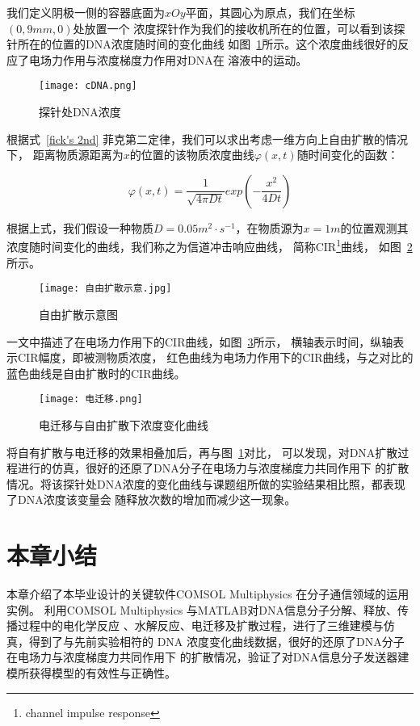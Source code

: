 我们定义阴极一侧的容器底面为$xOy$平面，其圆心为原点，我们在坐标$(0,9mm,0)$处放置一个
浓度探针作为我们的接收机所在的位置，可以看到该探针所在的位置的DNA浓度随时间的变化曲线
如图~\ref{fig:cDNAatP}所示。这个浓度曲线很好的反应了电场力作用与浓度梯度力作用对DNA在
溶液中的运动。
\begin{figure}[H]
    \centering
    \texttt{[image: cDNA.png]}
    \caption{探针处DNA浓度}
    \label{fig:cDNAatP}
\end{figure}

根据式~\ref{fick's 2nd} 菲克第二定律，我们可以求出考虑一维方向上自由扩散的情况下，
距离物质源距离为$x$的位置的该物质浓度曲线$\varphi(x,t)$随时间变化的函数：

\begin{equation}
    \varphi(x,t)= \frac{1}{\sqrt {4 \pi Dt}} exp(-\frac{x^2}{4Dt})
\end{equation}

根据上式，我们假设一种物质$D=0.05m^2\cdot s^{-1}$，在物质源为$x=1m$的位置观测其
浓度随时间变化的曲线，我们称之为信道冲击响应曲线，
简称CIR\footnote{channel impulse response}曲线，
如图~\ref{自由扩散示意图}所示。
\begin{figure}[H]
    \centering
    \texttt{[image: 自由扩散示意.jpg]}
    \caption{自由扩散示意图}
    \label{自由扩散示意图}
\end{figure}

\parencite{8405569}一文中描述了在电场力作用下的CIR曲线，如图~\ref{电迁移}所示，
横轴表示时间，纵轴表示CIR幅度，即被测物质浓度，
红色曲线为电场力作用下的CIR曲线，与之对比的蓝色曲线是自由扩散时的CIR曲线。
\begin{figure}[H]
    \centering
    \texttt{[image: 电迁移.png]}
    \caption{电迁移与自由扩散下浓度变化曲线}
    \label{电迁移}
\end{figure}

将自有扩散与电迁移的效果相叠加后，再与图~\ref{fig:cDNAatP}对比，
可以发现，对DNA扩散过程进行的仿真，很好的还原了DNA分子在电场力与浓度梯度力共同作用下
的扩散情况。将该探针处DNA浓度的变化曲线与课题组所做的实验结果相比照，都表现了DNA浓度该变量会
随释放次数的增加而减少这一现象。

\section{本章小结}
本章介绍了本毕业设计的关键软件COMSOL Multiphysics 在分子通信领域的运用实例。
利用COMSOL Multiphysics 与MATLAB对DNA信息分子分解、释放、传播过程中的电化学反应
、水解反应、电迁移及扩散过程，进行了三维建模与仿真，得到了与先前实验相符的
 DNA 浓度变化曲线数据，很好的还原了DNA分子在电场力与浓度梯度力共同作用下
 的扩散情况，验证了对DNA信息分子发送器建模所获得模型的有效性与正确性。